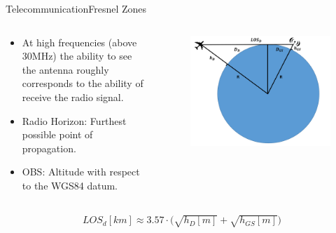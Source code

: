 \begin{frame}{Telecommunication}{Fresnel Zones}
  \begin{columns}[T]
    \begin{column}{.5\textwidth}
      \begin{block}{}
        \begin{itemize}
          \item {At high frequencies (above 30MHz) the ability to see the antenna roughly corresponds to the ability of receive the radio signal.}
          \item {Radio Horizon: Furthest possible point of propagation.}
          \item {OBS: Altitude with respect to the WGS84 datum.}
        \end{itemize}
      \end{block}
    \end{column}
    \begin{column}{.5\textwidth}
      \begin{figure}
        \includegraphics[scale=0.25]{figures/LOS.png}
      \end{figure}
    \end{column}
  \end{columns}

    \begin{align*}      
        LOS_d[km]  \approx {3.57\cdot (\sqrt{h_D[m]} + \sqrt{h_{GS}[m]}} )
    \end{align*}

\end{frame}